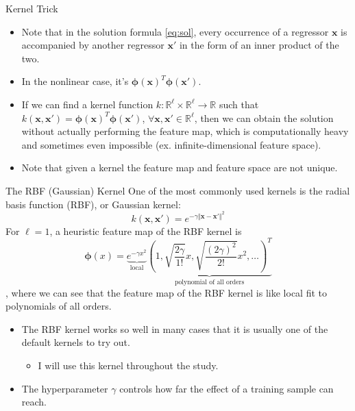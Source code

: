 \documentclass[aspectratio=169]{beamer}
\begin{document}
\begin{frame}{Kernel Trick}
\begin{itemize}
  \item Note that in the solution formula \ref{eq:sol}, every occurrence of a regressor $\mathbf{x}$ is accompanied by another regressor $\mathbf{x}'$ in the form of an inner product of the two.
  \item In the nonlinear case, it's $\bm{\phi}(\mathbf{x})^T\bm{\phi}(\mathbf{x}')$.
  \item If we can find a kernel function $k:\mathbb{R}^\ell\times\mathbb{R}^\ell\rightarrow\mathbb{R}$ such that $k(\mathbf{x},\mathbf{x}')=\bm{\phi}(\mathbf{x})^T\bm{\phi}(\mathbf{x}')$, $\forall\mathbf{x},\mathbf{x}'\in\mathbb{R}^\ell$, then we can obtain the solution without actually performing the feature map, which is computationally heavy and sometimes even impossible (ex. infinite-dimensional feature space).
  \item Note that given a kernel the feature map and feature space are not unique.
\end{itemize}
\end{frame}

\begin{frame}{The RBF (Gaussian) Kernel}
\footnotesize
One of the most commonly used kernels is the radial basis function (RBF), or Gaussian kernel:
\begin{equation}
  k(\mathbf{x},\mathbf{x}')=e^{-\gamma\Vert\mathbf{x}-\mathbf{x}'\Vert^2}
\end{equation}
For $\ell=1$, a heuristic feature map of the RBF kernel is
\begin{equation}
  \bm{\phi}(x)=\underbrace{e^{-\gamma x^2}}_\text{local}\underbrace{\left(1,\sqrt{\frac{2\gamma}{1!}}x,\sqrt{\frac{(2\gamma)^2}{2!}}x^2,\dots\right)^T}_\text{polynomial of all orders}
\end{equation}
, where we can see that the feature map of the RBF kernel is like local fit to polynomials of all orders.
\begin{itemize}
  \item The RBF kernel works so well in many cases that it is usually one of the default kernels to try out.
  \begin{itemize}
    \scriptsize
    \item I will use this kernel throughout the study.
  \end{itemize}
    \item The hyperparameter $\gamma$ controls how far the effect of a training sample can reach.
\end{itemize}
\end{frame}
\end{document}
